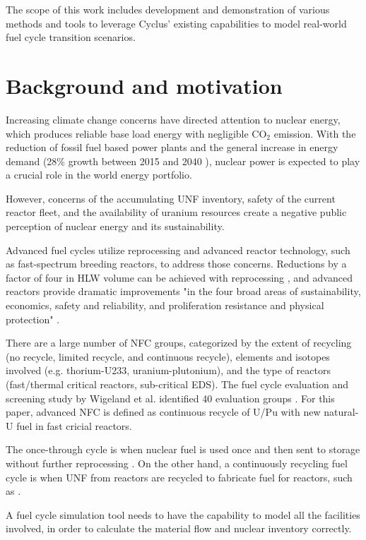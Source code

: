 The scope of this work includes development and demonstration of
various methods and tools to leverage Cyclus' existing
capabilities to model real-world fuel cycle transition scenarios.

\section{Background and motivation}
Increasing climate change concerns have directed attention
to nuclear energy, which produces reliable base load energy
with negligible CO$_2$ emission. With the reduction of fossil
fuel based power plants and the general increase in energy demand
(28\% growth between 2015 and 2040 \cite{conti_international_2016}),
nuclear power is expected to play a crucial role in the world energy portfolio.

However, concerns of the accumulating \gls{UNF} inventory,
safety of the current reactor fleet, and the availability of
uranium resources create a negative public perception of
nuclear energy and its sustainability.

Advanced fuel cycles utilize reprocessing
and advanced reactor technology, such as fast-spectrum breeding reactors,
to address those concerns. Reductions by a factor of four
in \gls{HLW} volume can be achieved with reprocessing \cite{widder_benefits_2010},
and advanced reactors provide dramatic improvements "in the four
broad areas of sustainability, economics, safety and reliability,
and proliferation resistance and physical protection" \cite{committee_technology_2002}.

There are a large number of \gls{NFC} groups, categorized by the extent of recycling
(no recycle, limited recycle, and continuous recycle), elements and isotopes involved
(e.g. thorium-U233, uranium-plutonium), and the type of reactors (fast/thermal critical
reactors, sub-critical \gls{EDS}). The fuel cycle evaluation and screening study by
Wigeland et al. identified 40 evaluation groups \cite{wigeland_nuclear_2014}. For this
paper, advanced \gls{NFC} is defined as continuous recycle of U/Pu with new natural-U
fuel in fast cricial reactors. 

The once-through cycle is when nuclear fuel is used once and then sent to 
storage without further reprocessing \cite{tsoulfanidis_nuclear_2013}.
On the other hand, a continuously recycling fuel cycle is when \gls{UNF}
from reactors are recycled to fabricate fuel for reactors, such
as .

A fuel cycle simulation tool needs
to have the capability to model all the facilities involved, in order to
calculate the material flow and nuclear inventory correctly.

